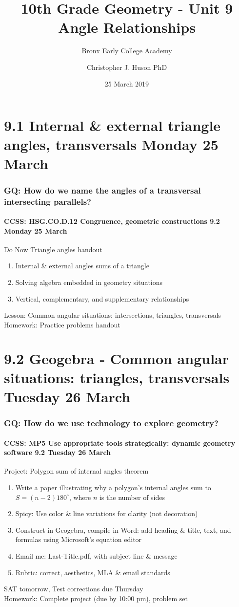 \documentclass{beamer}
\title{10th Grade Geometry - Unit 9 Angle Relationships}
\subtitle{Bronx Early College Academy}
\author{Christopher J. Huson PhD}
\date{25 March 2019}
\begin{document}
\frame{\titlepage}
\section[Outline]{}
\frame{\tableofcontents}


\section{9.1 Internal \& external triangle angles, transversals Monday 25 March}
  \frame
  {
    \frametitle{GQ: How do we name the angles of a transversal intersecting parallels?}
    \framesubtitle{CCSS: HSG.CO.D.12 Congruence, geometric constructions \hfill \alert{9.2 Monday 25 March}}

    \begin{block}{Do Now Triangle angles handout}
      \begin{enumerate}
        \item Internal \& external angles sums of a triangle
        \item Solving algebra embedded in geometry situations
        \item Vertical, complementary, and supplementary relationships
      \end{enumerate}
    \end{block}
    Lesson: Common angular situations: intersections, triangles, transversals\\
    Homework: Practice problems handout
  }

\section{9.2 Geogebra - Common angular situations: triangles, transversals Tuesday 26 March}
  \frame
  {
    \frametitle{GQ: How do we use technology to explore geometry?}
    \framesubtitle{CCSS: MP5 Use appropriate tools strategically: dynamic geometry software \hfill \alert{9.2 Tuesday 26 March}}

    \begin{block}{Project: Polygon sum of internal angles theorem}
      \begin{enumerate}
        \item Write a paper illustrating why a polygon's internal angles sum to $S=(n-2)180^\circ$, where $n$ is the number of sides
        \item Spicy: Use color \& line variations for clarity (not decoration)
        \item Construct in Geogebra, compile in Word: add heading \& title, text, and formulas using Microsoft's equation editor
        \item Email me: Last-Title.pdf, with subject line \& message
        \item Rubric: correct, aesthetics, MLA \& email standards
      \end{enumerate}
    \end{block}
    SAT tomorrow, \alert{Test corrections due Thursday}\\
    Homework: Complete project (due by 10:00 pm), problem set
  }
\end{document}
